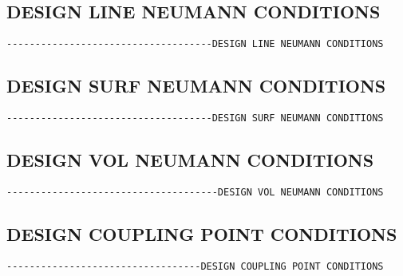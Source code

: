 \subsection{DESIGN LINE NEUMANN CONDITIONS}
\begin{verbatim}
------------------------------------DESIGN LINE NEUMANN CONDITIONS
\end{verbatim}



\subsection{DESIGN SURF NEUMANN CONDITIONS}
\begin{verbatim}
------------------------------------DESIGN SURF NEUMANN CONDITIONS
\end{verbatim}



\subsection{DESIGN VOL NEUMANN CONDITIONS}
\begin{verbatim}
-------------------------------------DESIGN VOL NEUMANN CONDITIONS
\end{verbatim}



\subsection{DESIGN COUPLING POINT CONDITIONS}
\begin{verbatim}
----------------------------------DESIGN COUPLING POINT CONDITIONS
\end{verbatim}



